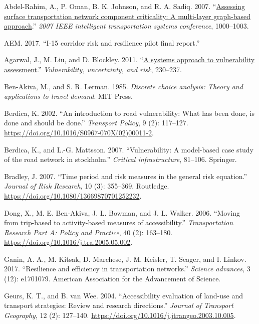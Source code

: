 \documentclass[]{ascelike-new}
\newlength{\cslhangindent}
\newenvironment{CSLReferences}[2] %
 {\begin{list}{}{%
  \setlength{\itemindent}{0pt}
  \setlength{\leftmargin}{0pt}
  \setlength{\parsep}{0pt}
  \ifodd #1
   \setlength{\leftmargin}{\cslhangindent}
   \setlength{\itemindent}{-1\cslhangindent}
  \fi
  \setlength{\itemsep}{#2\baselineskip}}}
 {\end{list}}
\begin{document}
\label{refs}
\begin{CSLReferences}{1}{0}
Abdel-Rahim, A., P. Oman, B. K. Johnson, and R. A. Sadiq. 2007.
{``\href{https://doi.org/10.1109/ITSC.2007.4357801}{Assessing surface
transportation network component criticality: A multi-layer graph-based
approach}.''} \emph{2007 IEEE intelligent transportation systems
conference}, 1000--1003.

AEM. 2017. {``I-15 corridor risk and resilience pilot final report.''}

Agarwal, J., M. Liu, and D. Blockley. 2011.
{``\href{https://doi.org/10.1061/41170(400)28}{A systems approach to
vulnerability assessment}.''} \emph{Vulnerability, uncertainty, and
risk}, 230--237.

Ben-Akiva, M., and S. R. Lerman. 1985. \emph{Discrete choice analysis:
Theory and applications to travel demand}. MIT Press.

Berdica, K. 2002. {``An introduction to road vulnerability: What has
been done, is done and should be done.''} \emph{Transport Policy}, 9
(2): 117--127. \url{https://doi.org/10.1016/S0967-070X(02)00011-2}.

Berdica, K., and L.-G. Mattsson. 2007. {``Vulnerability: A model-based
case study of the road network in stockholm.''} \emph{Critical
infrastructure}, 81--106. Springer.

Bradley, J. 2007. {``Time period and risk measures in the general risk
equation.''} \emph{Journal of Risk Research}, 10 (3): 355--369.
Routledge. \url{https://doi.org/10.1080/13669870701252232}.

Dong, X., M. E. Ben-Akiva, J. L. Bowman, and J. L. Walker. 2006.
{``Moving from trip-based to activity-based measures of
accessibility.''} \emph{Transportation Research Part A: Policy and
Practice}, 40 (2): 163--180.
\url{https://doi.org/10.1016/j.tra.2005.05.002}.

Ganin, A. A., M. Kitsak, D. Marchese, J. M. Keisler, T. Seager, and I.
Linkov. 2017. {``Resilience and efficiency in transportation
networks.''} \emph{Science advances}, 3 (12): e1701079. American
Association for the Advancement of Science.

Geurs, K. T., and B. van Wee. 2004. {``Accessibility evaluation of
land-use and transport strategies: Review and research directions.''}
\emph{Journal of Transport Geography}, 12 (2): 127--140.
\url{https://doi.org/10.1016/j.jtrangeo.2003.10.005}.


\end{CSLReferences}
\end{document}

